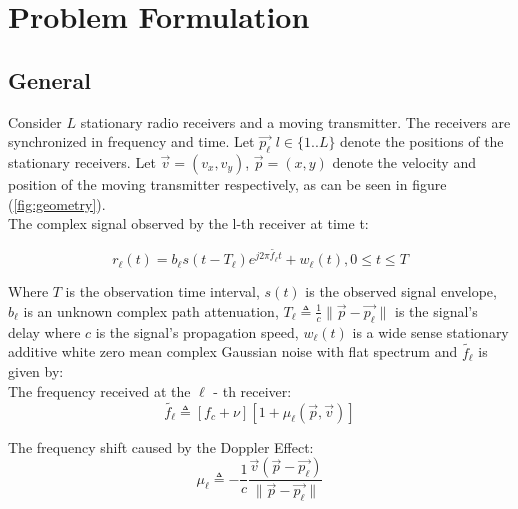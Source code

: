 
\chapter{Problem Formulation} %
\label{Chapter2}

\section{General}
Consider $L$ stationary radio receivers and a moving transmitter. The receivers are synchronized in frequency and time. Let  $\vec{p_\ell}$ $l\in{\{1..L\}}$ denote the positions of the stationary receivers. Let $\vec{v}=(v_x,v_y)$, $\vec{p}=(x,y)$ denote the velocity and position of the moving transmitter respectively, as can be seen in figure (\ref{fig:geometry}).\\

The complex signal observed by the l-th receiver at time t:

\begin{equation}
\label{eq:r_lDef}
r_\ell(t)=b_\ell s(t-T_\ell )e^{j2\pi \tilde{f_\ell} t}+w_\ell(t),  0\leq t\leq T                                              
\end{equation}

Where $T$ is the observation time interval, $s(t)$ is the observed signal envelope, $b_\ell$ is an unknown complex path attenuation, $T_\ell \triangleq \frac{1}{c}\|\vec{p} -\vec{p_\ell}\|$ is the signal's delay where $c$ is the signal's propagation speed, $w_\ell (t)$ is a wide sense stationary additive white zero mean complex Gaussian noise with flat spectrum and $\tilde{f_\ell}$ is given by:\\

The frequency received at the $\ell$ - th receiver: 
\begin{equation}
\label{eq:f_lDef}
\tilde{f_\ell}\triangleq[f_c+\nu][1+\mu_\ell (\vec{p} ,\vec{v})]                 
\end{equation}

 The frequency shift caused by the Doppler Effect:
\begin{equation} 
\mu_\ell \triangleq -\frac{1}{c} \frac{\vec{v}(\vec{p}-\vec{p_\ell})}{\|\vec{p}-\vec{p_\ell}\|}                             
\end{equation}

